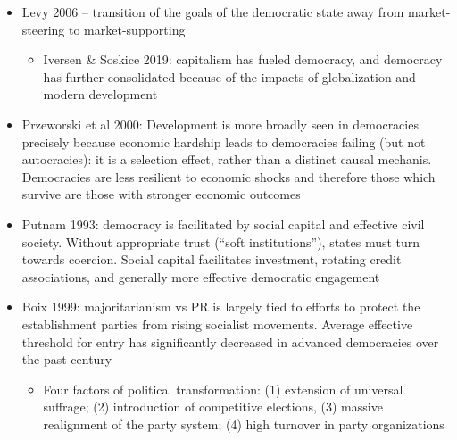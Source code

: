 \documentclass[12pt]{article}
\begin{document}
\begin{itemize}
    \begin{itemize}
        \item Dahl 1972: Candidates and parties change as the franchise expands, in an effort to better achieve their electoral goals. Often results in new parties or party change (see Muller 1997 for a more comprehensive discussion of parties changing)
        \item Huntington 1968: without sufficient political development to keep up with economic development -- which itself will bring greater inclusivity -- we should expect discontent and instability
        \item Ziblatt 2017: If this development does not allow for conservative parties to be meaningfully included in government, then the transition to democracy is likely to be unstable and short-term
    \end{itemize}
    \item Levy 2006 -- transition of the goals of the democratic state away from market-steering to market-supporting
    \begin{itemize}
        \item Iversen \& Soskice 2019: capitalism has fueled democracy, and democracy has further consolidated because of the impacts of globalization and modern development
    \end{itemize}
    \item Przeworski et al 2000: Development is more broadly seen in democracies precisely because economic hardship leads to democracies failing (but not autocracies): it is a selection effect, rather than a distinct causal mechanis. Democracies are less resilient to economic shocks and therefore those which survive are those with stronger economic outcomes
    \item Putnam 1993: democracy is facilitated by social capital and effective civil society. Without appropriate trust (``soft institutions''), states must turn towards coercion. Social capital facilitates investment, rotating credit associations, and generally more effective democratic engagement
    \item Boix 1999: majoritarianism vs PR is largely tied to efforts to protect the establishment parties from rising socialist movements. Average effective threshold for entry has significantly decreased in advanced democracies over the past century
    \begin{itemize}
        \item Four factors of political transformation: (1) extension of universal suffrage; (2) introduction of competitive elections, (3) massive realignment of the party system; (4) high turnover in party organizations

\end{itemize}
\end{itemize}
\end{document}
